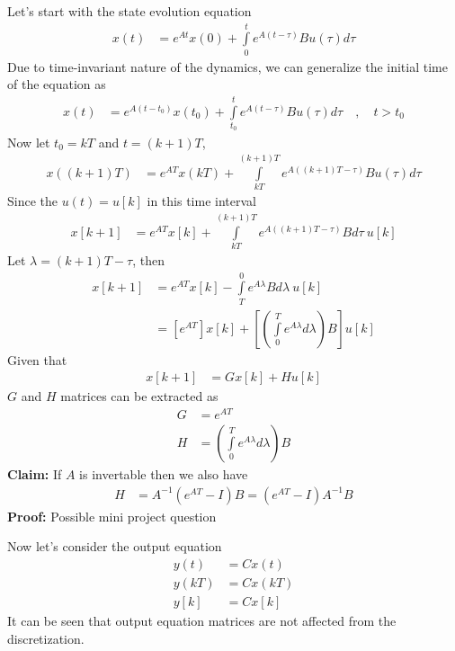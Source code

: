 \documentclass[twoside]{article}
\begin{document}
Let's start with the state evolution equation
%
\begin{align*}
  x(t) &= e^{A t} x(0) + \int\limits_{0}^{t} e^{A ( t - \tau ) } B
         u(\tau) d \tau
\end{align*}
%
Due to time-invariant nature of the dynamics, we can 
generalize the initial time of the equation as
%
\begin{align*}
  x(t) &= e^{A (t - t_0)} x(t_0) + \int\limits_{t_0}^{t} e^{A ( t - \tau ) } B
         u(\tau) d \tau \quad , \quad t > t_0
\end{align*}
%
Now let $t_0 = k T$ and $t = (k+1) T$,
%
\begin{align*}
  x( (k+1) T ) &= e^{A T} x(k T) + \int\limits_{kT}^{(k+1)T} e^{A ( (k+1)T - \tau ) } B
         u(\tau) d \tau 
\end{align*}
%
Since the $u(t) = u[k]$ in this time interval
%
\begin{align*}
  x[k+1] &= e^{A T} x[k] + \int\limits_{kT}^{(k+1)T} e^{A ( (k+1)T -
           \tau ) } B d \tau \ u[k]
\end{align*}
%
Let $\lambda = (k+1)T -\tau $, then
%
\begin{align*}
  x[k+1] &= e^{A T} x[k] - \int\limits_{T}^{0} e^{A \lambda } B d \lambda \ u[k]
\\
&= \left[ e^{A T} \right] x[k] + \left[\left( \int\limits_{0}^{T}
  e^{A \lambda } d \lambda \right) B \right] u[k]
\end{align*}
% 
Given that 
%
\begin{align*}
  x[k+1] &= G x[k] + H u[k]
\end{align*}
%
$G$ and $H$ matrices can be extracted as
%
\begin{align*}
  G &= e^{A T}
\\
 H &= \left( \int\limits_{0}^{T}
  e^{A \lambda } d \lambda \right) B
\end{align*}
%
\textbf{Claim:} If $A$ is invertable then we also have
%
\begin{align*}
 H &= A^{-1} \left( e^{AT} - I \right) B = \left( e^{AT} - I \right)
     A^{-1}  B  
\end{align*}
%
\textbf{Proof:} Possible mini project question

Now let's consider the output equation
%
%
\begin{align*}
  y(t) &= C x(t) 
         \\
 y(k T) &= C x( k T) 
\\
 y[k] &= C x[k] 
\end{align*}
%
It can be seen that output equation matrices are not affected from
the discretization.
\end{document}
